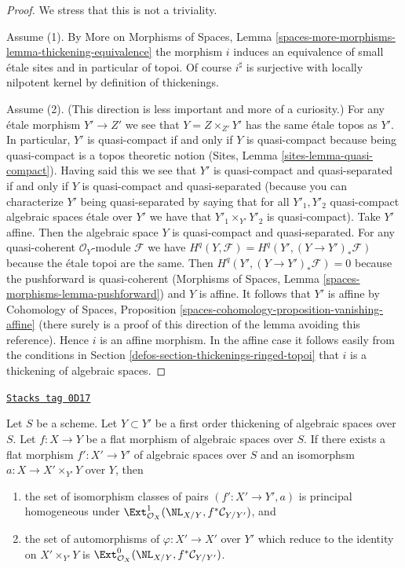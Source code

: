 \begin{proof}
We stress that this is not a triviality.

\medskip\noindent
Assume (1). By More on Morphisms of Spaces, Lemma
\ref{spaces-more-morphisms-lemma-thickening-equivalence}
the morphism $i$ induces an equivalence of small \'etale
sites and in particular of topoi. Of course $i^\sharp$
is surjective with locally nilpotent kernel by definition
of thickenings.

\medskip\noindent
Assume (2). (This direction is less important and more of
a curiosity.) For any \'etale morphism $Y' \to Z'$ we see
that $Y = Z \times_{Z'} Y'$ has the same \'etale topos
as $Y'$. In particular, $Y'$ is quasi-compact if and only if
$Y$ is quasi-compact because being quasi-compact
is a topos theoretic notion (Sites, Lemma \ref{sites-lemma-quasi-compact}).
Having said this we see that $Y'$ is quasi-compact and quasi-separated
if and only if $Y$ is quasi-compact and quasi-separated
(because you can characterize $Y'$ being quasi-separated by saying
that for all $Y'_1, Y'_2$ quasi-compact algebraic spaces \'etale over $Y'$
we have that $Y'_1 \times_{Y'} Y'_2$ is quasi-compact).
Take $Y'$ affine. Then the algebraic space $Y$ is
quasi-compact and quasi-separated. For any
quasi-coherent $\mathcal{O}_Y$-module $\mathcal{F}$ we have
$H^q(Y, \mathcal{F}) = H^q(Y', (Y \to Y')_*\mathcal{F})$
because the \'etale topoi are the same.
Then $H^q(Y', (Y \to Y')_*\mathcal{F}) = 0$
because the pushforward is quasi-coherent
(Morphisms of Spaces, Lemma \ref{spaces-morphisms-lemma-pushforward})
and $Y$ is affine. It follows that $Y'$ is affine by
Cohomology of Spaces, Proposition
\ref{spaces-cohomology-proposition-vanishing-affine}
(there surely is a proof of this direction of the lemma
avoiding this reference).
Hence $i$ is an affine morphism. In the affine case it
follows easily from the conditions in
Section \ref{defos-section-thickenings-ringed-topoi}
that $i$ is a thickening of algebraic spaces.
\end{proof}

\begin{lemma}
\label{defos-lemma-deform-spaces}
\href{https://stacks.math.columbia.edu/tag/0D17}{\texttt{Stacks tag 0D17}}

Let $S$ be a scheme.
Let $Y \subset Y'$ be a first order thickening of algebraic spaces
over $S$.
Let $f : X \to Y$ be a flat morphism of algebraic spaces over $S$.
If there exists a flat morphism $f' : X' \to Y'$ of algebraic spaces over $S$
and an isomorphsm $a : X \to X' \times_{Y'} Y$ over $Y$, then
\begin{enumerate}
\item the set of isomorphism classes of pairs $(f' : X' \to Y', a)$ is
principal homogeneous under
$\Ext^1_{\mathcal{O}_X}(\NL_{X/Y}, f^*\mathcal{C}_{Y/Y'})$, and
\item the set of automorphisms of $\varphi : X' \to X'$
over $Y'$ which reduce to the identity on $X' \times_{Y'} Y$
is $\Ext^0_{\mathcal{O}_X}(\NL_{X/Y}, f^*\mathcal{C}_{Y/Y'})$.
\end{enumerate}
\end{lemma}

